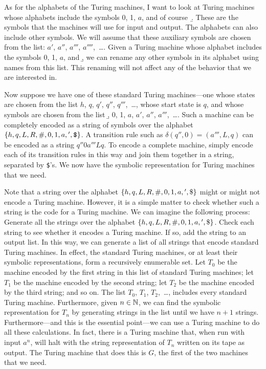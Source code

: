 As for the alphabets of the Turing machines, I want to look at
Turing machines whose alphabets include the symbols 0, 1, $a$, and of
course~\b.
These are the symbols that the machines will use for input and output.
The alphabets can also include other symbols.  We will assume that
these auxiliary symbols are chosen from the list: $a'$, $a''$, $a'''$,
$a''''$,~\dots.  Given a Turing machine whose alphabet includes
the symbols 0, 1, $a$, and \b, we can rename any other symbols in its
alphabet using names from this list.  This renaming will not
affect any of the behavior that we are interested in.

Now suppose we have one of these standard Turing machines---one
whose states are chosen from the list $h$, $q$, $q'$, $q''$, $q'''$,~\dots,
whose start state is $q$, and whose symbols are chosen from the list
\b, 0, 1, $a$, $a'$, $a''$, $a'''$,~\dots.  Such a machine can be
completely encoded as a string of symbols over the alphabet
$\{h,q,L,R,{\tt\#},0,1,a,{}',\text{\tt\$}\}$.  A transition rule
such as $\delta(q'',0)=(a''',L,q)$ can be encoded as a
string $q''0a'''Lq$.  To encode a complete machine, simply encode
each of its transition rules in this way and join them together in a string,
separated by {\tt\$}'s.  We now have the symbolic representation for
Turing machines that we need.

Note that a string over the alphabet $\{h,q,L,R,{\tt\#},0,1,a,{}',\text{\$}\}$
might or might not encode a Turing machine.  However, it is a simple
matter to check whether such a string is the code for a Turing machine.
We can imagine the following process:  Generate all the strings over the
alphabet $\{h,q,L,R,{\tt\#},0,1,a,{}',\text{\$}\}$.  Check each string
to see whether it encodes a Turing machine.  If so, add the string
to an output list. In this way, we can generate a list of
all strings that encode standard Turing machines.  In effect,
the standard Turing machines, or at least their symbolic representations,
form a recursively enumerable set.  Let $T_0$ be the
machine encoded by the first string in this list of
standard Turing machines; let $T_1$ be
the machine encoded by the second string; let $T_2$ be the
machine encoded by the third string; and so on.  The list
$T_0$, $T_1$, $T_2$,~\dots, includes every standard Turing machine.
Furthermore, given $n\in{\mathbb N}$, we can find the symbolic representation
for $T_n$ by generating strings in the list until we have $n+1$ strings.
Furthermore---and this is the essential point---we can use a Turing
machine to do all these calculations.  In fact, there is
a Turing machine that, when run with input $a^n$, will halt with
the string representation of $T_n$ written on its tape as output.
The Turing machine that does this is $G$, the first of the
two machines that we need.

